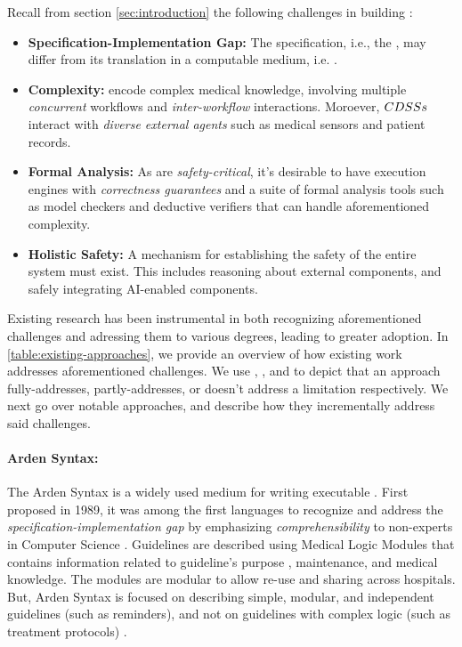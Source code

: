 Recall from section \ref{sec:introduction} the following
challenges in building \CDSSs{}:
\begin{itemize}
  \item \textbf{Specification-Implementation Gap:} The specification,
    i.e., the \BPG{}, may differ from its translation in a computable
    medium, i.e. \CIG{}.
  \item \textbf{Complexity:} \BPGs{} encode complex medical knowledge,
    involving multiple \emph{concurrent} workflows and \emph{inter-workflow}
    interactions. Moroever, $CDSSs{}$ interact with \emph{diverse
    external agents} such as medical sensors and patient records.
  \item \textbf{Formal Analysis:} As \CDSSs{} are \emph{safety-critical},
    it's desirable to have execution engines with \emph{correctness guarantees}
    and a suite of formal analysis tools such as model checkers and deductive
    verifiers that can handle aforementioned complexity.
  \item \textbf{Holistic Safety:} A mechanism for establishing the safety
    of the entire system must exist. This includes reasoning about external
    components, and safely integrating AI-enabled components.
\end{itemize}

Existing research has been instrumental in both recognizing aforementioned
challenges and adressing them to various degrees, leading to greater \CDSS{}
adoption. In \tablename{} \ref{table:existing-approaches}, we provide an overview of
how existing work addresses aforementioned challenges. We use
\greencheck{}, \cancelcheck{}, and \redcross{} to depict that an approach
fully-addresses, partly-addresses, or doesn't address a limitation respectively.
We next go over notable approaches, and describe how they incrementally
address said challenges.

\paragraph{Arden Syntax:}

The Arden Syntax \cite{HripcsakCBM94} is a widely used medium for
writing executable \BPGs{}. First proposed in 1989, it was among the
first languages to recognize and address the \emph{specification-implementation
gap} by emphasizing \emph{comprehensibility} to non-experts in Computer Science \cite{SamwaldJBI12}.
Guidelines are described using Medical
Logic Modules that contains information related to guideline's purpose
, maintenance, and medical knowledge. The modules are modular to allow
re-use and sharing across hospitals. But, Arden Syntax
is focused on describing simple, modular, and independent
guidelines (such as reminders), and not on guidelines with complex logic (such
as treatment protocols) \cite{PelegJBI01}.

